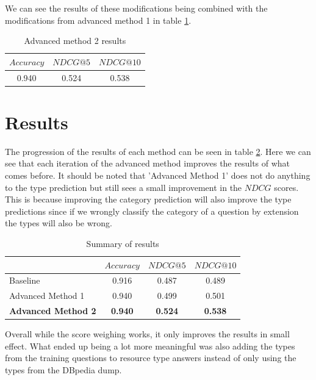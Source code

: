 \documentclass[sigconf]{acmart}
\begin{document}
We can see the results of these modifications being combined with the modifications from advanced method 1 in table \ref{tab:advanced2_res}.

\begin{table}[h]
    \centering
    \caption{Advanced method 2 results}
    \begin{tabular}{c|c|c}
    $Accuracy$ & $NDCG@5$ & $NDCG@10$ \\
    \hline
    0.940 & 0.524 & 0.538
    \end{tabular}
    \label{tab:advanced2_res}
\end{table}


\section{Results}
The progression of the results of each method can be seen in table \ref{tab:sum_res}. Here we can see that each iteration of the advanced method improves the results of what comes before. It should be noted that 'Advanced Method 1' does not do anything to the type prediction but still sees a small improvement in the $NDCG$ scores. This is because improving the category prediction will also improve the type predictions since if we wrongly classify the category of a question by extension the types will also be wrong. 

\begin{table}[h]
\begin{center}
\caption{Summary of results}
\begin{tabular}{l|c|c|c}
     & $Accuracy$ & $NDCG@5$ & $NDCG@10$ \\
    \hline
    Baseline & 0.916 &  0.487 & 0.489 \\
    Advanced Method 1 & 0.940 & 0.499 &  0.501 \\
    \textbf{Advanced Method 2} & \textbf{0.940} & \textbf{0.524} &  \textbf{0.538} \\
\end{tabular}
\label{tab:sum_res}
\end{center}
\end{table}

Overall while the score weighing works, it only improves the results in small effect. What ended up being a lot more meaningful was also adding the types from the training questions to resource type answers instead of only using the types from the DBpedia dump.
\end{document}
